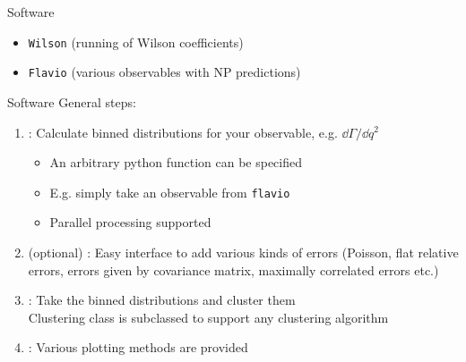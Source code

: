 \begin{frame}{Software}
\begin{itemize}
		\item {} \texttt{Wilson} {\footnotesize(running of Wilson coefficients)}
		\item {} \texttt{Flavio} {\footnotesize(various observables with NP predictions)}
	\end{itemize}
\end{frame}


\begin{frame}{Software}
	General steps:
	\begin{enumerate}
		\item {}: Calculate binned distributions for your observable, e.g. $\dd\Gamma/\dd q^2$
		\begin{itemize}
			\item An arbitrary python function can be specified
			\item E.g. simply take an observable from \texttt{flavio}
			\item Parallel processing supported
		\end{itemize}
		\item (optional) : Easy interface to add various kinds of errors {\footnotesize(Poisson, flat relative errors, errors given by covariance matrix, maximally correlated errors etc.)}
		\item {}: Take the binned distributions and cluster them\\
		{\footnotesize Clustering class is subclassed to support any clustering algorithm}
		\item {}: Various plotting methods are provided
	\end{enumerate}
\end{frame}

